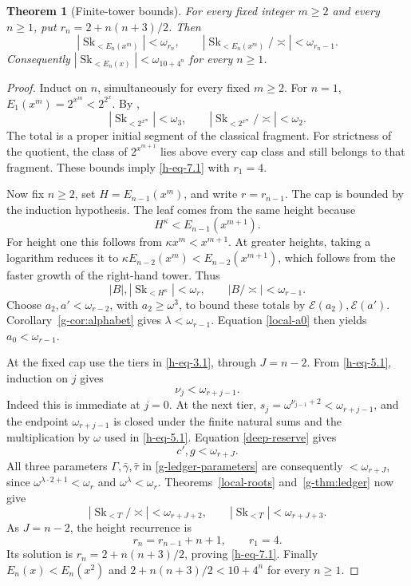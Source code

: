 \documentclass[11pt]{article}
\newtheorem{theorem}{Theorem}[section]
\theoremstyle{definition}
\theoremstyle{remark}
\newcommand{\Sk}{\operatorname{Sk}}
\newcommand{\arch}{\mathrel{\asymp}}
\newcommand{\EE}{\mathcal E}
\numberwithin{equation}{section}
\begin{document}
\begin{theorem}[Finite-tower bounds]\label{h-thm:main}
For every fixed integer \(m\ge2\) and every \(n\ge1\), put
\(r_n=2+n(n+3)/2\). Then
\begin{equation}
 |\Sk_{<E_n(x^m)}|<\omega_{r_n},\qquad
 |\Sk_{<E_n(x^m)}/\arch|<\omega_{r_n-1}.
 \label{h-eq-7.1}
\end{equation}
Consequently \(|\Sk_{<E_n(x)}|<\omega_{10+4^n}\) for every
\(n\ge1\).
\end{theorem}
\begin{proof}
Induct on \(n\), simultaneously for every fixed \(m\ge2\).
For \(n=1\), \(E_1(x^m)=2^{x^m}<2^{2^x}\).
By \cite[Theorem 13.1]{BM},
\[
 |\Sk_{<2^{x^m}}|<\omega_3,\qquad
 |\Sk_{<2^{x^m}}/\arch|<\omega_2.
\]
The total is a proper initial segment of the classical fragment.
For strictness of the quotient, the class of \(2^{x^{m+1}}\)
lies above every cap class and still belongs to that fragment.
These bounds imply \eqref{h-eq-7.1} with \(r_1=4\).

Now fix \(n\ge2\), set \(H=E_{n-1}(x^m)\), and write
\(r=r_{n-1}\). The cap is bounded by the induction hypothesis.
The leaf comes from the same height because
\begin{equation}
 H^\kappa<E_{n-1}(x^{m+1}).
 \label{h-eq-7.2}
\end{equation}
For height one this follows from \(\kappa x^m<x^{m+1}\).
At greater heights, taking a logarithm reduces it to
\(\kappa E_{n-2}(x^m)<E_{n-2}(x^{m+1})\), which follows
from the faster growth of the right-hand tower.
Thus
\[
 |B|,|\Sk_{<H^\kappa}|<\omega_r,\qquad
 |B/\arch|<\omega_{r-1}.
\]
Choose \(a_2,a'<\omega_{r-2}\), with \(a_2\ge\omega^3\),
to bound these totals by \(\EE(a_2),\EE(a')\).
Corollary~\ref{g-cor:alphabet} gives \(\lambda<\omega_{r-1}\).
Equation \eqref{local-a0} then yields \(a_0<\omega_{r-1}\).

At the fixed cap use the tiers in \eqref{h-eq-3.1}, through \(J=n-2\).
From \eqref{h-eq-5.1}, induction on \(j\) gives
\begin{equation}
 \nu_j<\omega_{r+j-1}.
 \label{h-eq-7.3}
\end{equation}
Indeed this is immediate at \(j=0\). At the next tier,
\(s_j=\omega^{\nu_{j-1}+2}<\omega_{r+j-1}\), and the endpoint \(\omega_{r+j-1}\)
is closed under the finite natural sums and the
multiplication by \(\omega\) used in \eqref{h-eq-5.1}.
Equation \eqref{deep-reserve} gives
\[
 c',g<\omega_{r+J}.
\]
All three parameters \(\Gamma,\bar\gamma,\bar\tau\) in
\eqref{g-ledger-parameters} are consequently \(<\omega_{r+J}\), since
\(\omega^{\lambda\cdot2+1}<\omega_r\) and
\(\omega^\lambda<\omega_r\).
Theorems~\ref{local-roots} and~\ref{g-thm:ledger} now give
\begin{equation}
 |\Sk_{<T}/\arch|<\omega_{r+J+2},\qquad
 |\Sk_{<T}|<\omega_{r+J+3}.
 \label{h-eq-7.4}
\end{equation}
As \(J=n-2\), the height recurrence is
\[
 r_n=r_{n-1}+n+1,\qquad r_1=4.
\]
Its solution is \(r_n=2+n(n+3)/2\), proving \eqref{h-eq-7.1}.
Finally \(E_n(x)<E_n(x^2)\) and
\(2+n(n+3)/2<10+4^n\) for every \(n\ge1\).
\end{proof}
\end{document}
